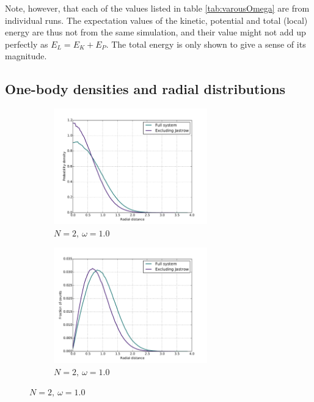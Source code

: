 \documentclass[english, a4paper]{article}
\begin{document}
	Note, however, that each of the values listed in table \ref{tab:varousOmega} are from individual runs.
	The expectation values of the kinetic, potential and total (local) energy are thus not from the same simulation, and their value might not add up perfectly as $E_L = E_K + E_P$.
	The total energy is only shown to give a sense of its magnitude.
	

\newpage


\subsection{One-body densities and radial distributions}
\begin{figure}[H]
	
	\begin{subfigure}{0.5\textwidth}
		\includegraphics[width=\textwidth, height= 5cm]{figures/radialDistribution/OneBodyDensityN2w100Se7.pdf}
		\caption{$N=2,\:\omega=1.0$}
	\end{subfigure}
	\begin{subfigure}{0.5\textwidth}
		\includegraphics[width=\textwidth, height= 5cm]{figures/radialDistribution/radialDistributionN2w100Se7.pdf}
		\caption{$N=2,\:\omega=1.0$}
	\end{subfigure}
	
	\vspace{1mm}
	

\end{figure}
\end{document}
